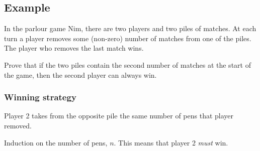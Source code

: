 \subsection{Example}
In the parlour game Nim, there are two players and two piles of matches. At each
turn a player removes some (non-zero) number of matches from one of the piles.
The player who removes the last match wins.

Prove that if the two piles contain the second number of matches at the start of
the game, then the second player can always win.

\subsubsection{Winning strategy} Player 2 takes from the opposite pile the same
number of pens that player removed.

Induction on the number of pens, $n$. This means that player 2 \emph{must} win.